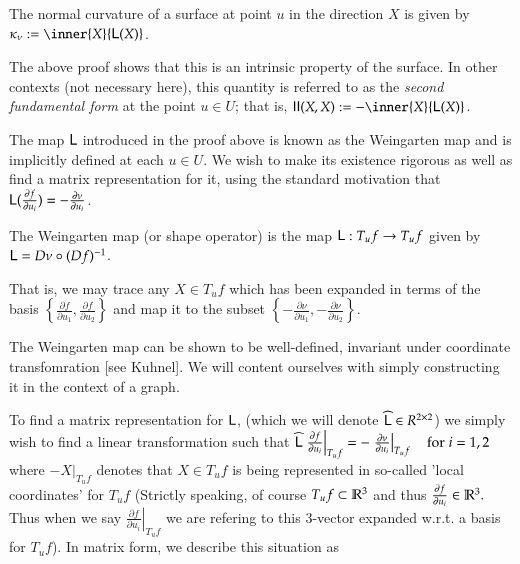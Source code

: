		\begin{defn}
			The normal curvature of a surface at point $u$ in the direction $X$ is given by $\kappa_\nu :=  \inner{X}{\wein(X)}$.
		\end{defn}
		The above proof shows that this is an intrinsic property of the surface.   In other contexts (not necessary here), this quantity is referred to as the \textit{second fundamental form} at the point $u \in U$; that is, $ \mathbf{II}(X,X) := - \inner{X}{\wein(X)}$.
		
		
		The map $\mathsf{L}$ introduced in the proof above is known as the Weingarten map
		and is implicitly defined at each $u \in U$. 
		We wish to make its existence rigorous as well as find a matrix representation for it, using the standard motivation that $\mathsf{L}(\frac{\partial f}{\partial u_i}) = - \frac{\partial \nu}{\partial u_i}$.
		
	
		\begin{defn}
		The Weingarten map (or shape operator) is the map $\mathsf{L}: T_u f \to T_u f$ given by
		$\mathsf{L} = D\nu \circ (Df)^{-1}$.
		\end{defn}
		
		
		That is, we may trace any $X \in T_u f$ which has been expanded in terms of the basis 
		$\left\{\frac{\partial f}{\partial u_1} , \frac{\partial f}{\partial u_2}\right\}$
		and map it to the subset $\left\{-\frac{\partial \nu}{\partial u_1} , -\frac{\partial \nu}{\partial u_2}\right\}$. 
		
		The Weingarten map can be shown to be well-defined, invariant under coordinate transfomration [see Kuhnel]. We will content ourselves with simply constructing it in the context of a graph. 		
		
		To find a matrix representation for $\mathsf{L}$, (which we will denote $\widehat{\mathsf{L}} \in R^{2\times2}$) we simply wish to find a linear transformation
		such that
		$\widehat{\mathsf{L}} \left.\frac{\partial f}{\partial u_i}\right|_{T_u f}
			= - \left.\frac{\partial \nu}{\partial u_i}\right|_{T_u f} \quad \textrm{for} \; i=1,2$
				where $- \left.X\right|_{T_u f}$ denotes that $X \in T_u f$ is being represented in so-called
		'local coordinates' for $T_u f$ (Strictly speaking, of course $T_u f \subset \mathbb{R}^3$ and thus
		$\frac{\partial f}{\partial u_i} \in \mathbb{R}^3.$ Thus when we say $ \left.\frac{\partial f}{\partial u_i}\right|_{T_u f}$ we are refering to this 3-vector expanded w.r.t. a basis for $T_u f$). In matrix form, we describe this situation as
		

